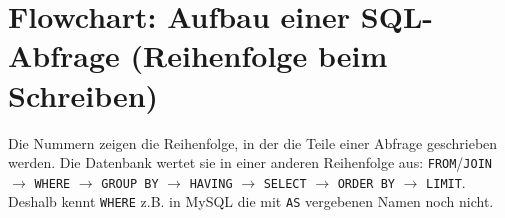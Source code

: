 \begingroup
\centering
\section*{Flowchart: Aufbau einer SQL-Abfrage (Reihenfolge beim Schreiben)}
{\small Die Nummern zeigen die Reihenfolge, in der die Teile einer Abfrage geschrieben werden. Die Datenbank wertet sie in einer anderen Reihenfolge aus: \lstinline|FROM|/\lstinline|JOIN| $\rightarrow$ \lstinline|WHERE| $\rightarrow$ \lstinline|GROUP BY| $\rightarrow$ \lstinline|HAVING| $\rightarrow$ \lstinline|SELECT| $\rightarrow$ \lstinline|ORDER BY| $\rightarrow$ \lstinline|LIMIT|. Deshalb kennt \lstinline|WHERE| z.B. in MySQL die mit \lstinline|AS| vergebenen Namen noch nicht.\par}
\pagestyle{empty}

